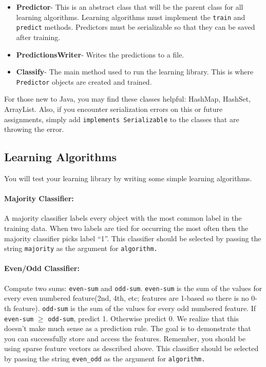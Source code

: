 \documentclass[11pt]{article}
\begin{document}
\begin{itemize}
\item {\bf Predictor}- This is an abstract class that will be the parent class for all learning algorithms. Learning algorithms must implement the {\tt train} and {\tt predict} methods. Predictors must be serializable so that they can be saved after training.

\item {\bf PredictionsWriter}- Writes the predictions to a file.

\item {\bf Classify}- The main method used to run the learning library. This is where {\tt Predictor} objects are created and trained.

\end{itemize}

For those new to Java, you may find these classes helpful: HashMap, HashSet, ArrayList. Also, if you encounter serialization errors on this or future assignments, simply add {\tt implements Serializable} to the classes that are throwing the error.

\subsection{Learning Algorithms}
You will test your learning library by writing some simple learning algorithms.
\paragraph{Majority Classifier:} A majority classifier labels every object with the most common label in the training data. When two labels are tied for occurring the most often then the majority classifier picks label ``1''. This classifier should be selected by passing the string {\tt majority} as the argument for {\tt algorithm.}

\paragraph{Even/Odd Classifier:} Compute two sums: {\tt even-sum} and {\tt odd-sum}. {\tt even-sum} is the sum of the values for every even numbered feature(2nd, 4th, etc; features are 1-based so there is no 0-th feature). {\tt odd-sum} is the sum of the values for every odd numbered feature. If {\tt even-sum} $\ge$ {\tt odd-sum}, predict 1. Otherwise predict 0. We realize that this doesn't make much sense as a prediction rule. The goal is to demonstrate that you can successfully store and access the features. Remember, you should be using sparse feature vectors as described above. This classifier should be selected by passing the string {\tt even\_odd} as the argument for {\tt algorithm.}
\end{document}
